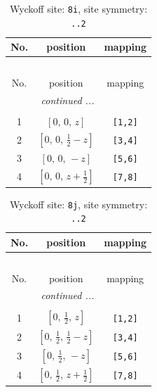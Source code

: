 \documentclass[fleqn,8pt]{jsarticle}
\begin{document}
\renewcommand{\arraystretch}{1.2}
\begin{longtable}{ccc}
\caption{Wyckoff site: {\tt 8i}, site symmetry: {\tt ..2}}
 \\
 \hline \hline
No. & position & mapping \\ \hline \endfirsthead

\multicolumn{2}{l}{\tablename\ \thetable{}} \\
 \hline \hline
No. & position & mapping \\ \hline \endhead

 \hline \hline
\multicolumn{2}{r}{\footnotesize\it continued ...} \\ \endfoot

 \hline \hline
\multicolumn{2}{r}{} \\ \endlastfoot

1 & $\left[ 0,\, 0,\, z \right]$ & {\tt [1,2]} \\ \hline
2 & $\left[ 0,\, 0,\, \frac{1}{2} - z \right]$ & {\tt [3,4]} \\ \hline
3 & $\left[ 0,\, 0,\, - z \right]$ & {\tt [5,6]} \\ \hline
4 & $\left[ 0,\, 0,\, z + \frac{1}{2} \right]$ & {\tt [7,8]} \\
\end{longtable}
\renewcommand{\arraystretch}{1.2}
\begin{longtable}{ccc}
\caption{Wyckoff site: {\tt 8j}, site symmetry: {\tt ..2}}
 \\
 \hline \hline
No. & position & mapping \\ \hline \endfirsthead

\multicolumn{2}{l}{\tablename\ \thetable{}} \\
 \hline \hline
No. & position & mapping \\ \hline \endhead

 \hline \hline
\multicolumn{2}{r}{\footnotesize\it continued ...} \\ \endfoot

 \hline \hline
\multicolumn{2}{r}{} \\ \endlastfoot

1 & $\left[ 0,\, \frac{1}{2},\, z \right]$ & {\tt [1,2]} \\ \hline
2 & $\left[ 0,\, \frac{1}{2},\, \frac{1}{2} - z \right]$ & {\tt [3,4]} \\ \hline
3 & $\left[ 0,\, \frac{1}{2},\, - z \right]$ & {\tt [5,6]} \\ \hline
4 & $\left[ 0,\, \frac{1}{2},\, z + \frac{1}{2} \right]$ & {\tt [7,8]} \\
\end{longtable}
\end{document}
